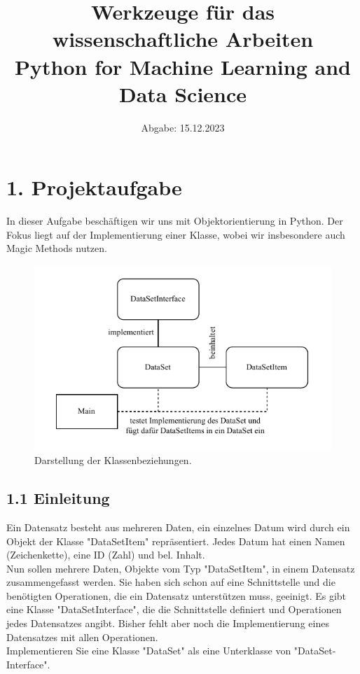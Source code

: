 \documentclass[]{article}
\begin{document}
\title{\textbf{ Werkzeuge für das wissenschaftliche Arbeiten}\\
 \normalsize Python for Machine Learning and Data Science}
\date{Abgabe: 15.12.2023}
\maketitle

\renewcommand{\contentsname}{Inhaltsverzeichnis} 
\tableofcontents 

\vspace{1em}

\setcounter{secnumdepth}{0} 
\section{1. Projektaufgabe}
In dieser Aufgabe beschäftigen wir uns mit Objektorientierung in Python. Der Fokus liegt auf der Implementierung einer Klasse, wobei wir insbesondere auch Magic Methods nutzen.\\

\renewcommand{\figurename}{Abbildung}
\begin{figure}[htbp]
  \centering
  \includegraphics[width=\textwidth]{../diagram/classes_files.pdf}
  \caption{Darstellung der Klassenbeziehungen.\normalsize}
\end{figure}

\subsection{1.1 Einleitung}
Ein Datensatz besteht aus mehreren Daten, ein einzelnes Datum wird durch ein Objekt der Klasse "DataSetItem" repräsentiert. Jedes Datum hat einen Namen (Zeichenkette), eine ID (Zahl) und bel. Inhalt. \\
Nun sollen mehrere Daten, Objekte vom Typ "DataSetItem", in einem Datensatz zusammengefasst werden. Sie haben sich schon auf eine Schnittstelle und die benötigten Operationen, die ein Datensatz unterstützen muss, geeinigt. Es gibt eine Klasse "DataSetInterface", die die Schnittstelle definiert und Operationen jedes Datensatzes angibt. Bisher fehlt aber noch die Implementierung eines Datensatzes mit allen Operationen. 
\\
Implementieren Sie eine Klasse "DataSet" als eine Unterklasse von "DataSet- Interface".
\end{document}
